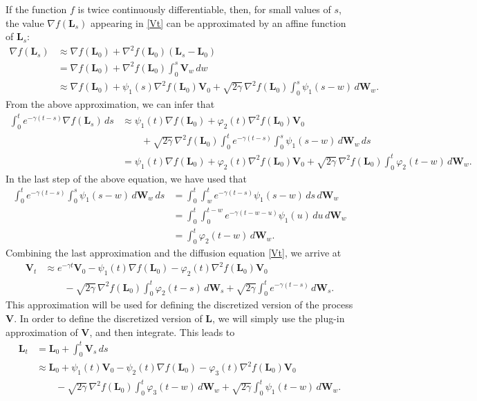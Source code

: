 \documentclass[a4paper,bej,preprint,reqno]{imsart}
\newcommand\bL{\boldsymbol L}
\newcommand\bW{\boldsymbol W}
\newcommand\bV{\boldsymbol V}
\begin{document}
If the function $f$ is twice continuously differentiable, then, for small
values of $s$, the value $\nabla f(\bL_s)$ appearing in \eqref{Vt} can be approximated by an affine function of $\bL_s$:
\begin{align}
\nabla f(\bL_s)
	&\approx \nabla f(\bL_0) + \nabla^2 f(\bL_0) (\bL_s-\bL_0)\\
	& = \nabla f(\bL_0) + \nabla^2 f(\bL_0) \int_0^s \bV_w\,dw\\
	& \approx \nabla f(\bL_0) + \psi_1(s)\nabla^2 f(\bL_0) \bV_0 + \sqrt{2\gamma}\,
	\nabla^2f(\bL_0) \int_0^s \psi_1(s-w)\,d\bW_w.\label{approx_grad}
\end{align}
From the above
approximation, we can infer that
\begin{align}\label{approx}
\int_0^t e^{-\gamma (t-s)} \nabla f(\bL_s)\,ds
	&\approx  \psi_1(t)\nabla f(\bL_0) + \varphi_2(t)\nabla^2 f(\bL_0) \bV_0\\
	&\qquad +
	 \sqrt{2\gamma}\, \nabla^2f(\bL_0) \int_0^te^{-\gamma (t-s)}\int_0^s \psi_1(s-w)\,
	d\bW_w\,ds\\
	&= \psi_1(t)\nabla f(\bL_0) + \varphi_2(t)\nabla^2 f(\bL_0) \bV_0+
	\sqrt{2\gamma}\,\nabla^2f(\bL_0) \int_0^t \varphi_2(t-w)\,d\bW_w.
\end{align}
In the last step of the above equation, we have used that
\begin{align}
\int_0^te^{-\gamma (t-s)}\int_0^s \psi_1(s-w)\,d\bW_w\,ds
	& = \int_0^t \int_{w}^t e^{-\gamma (t-s)} \psi_1(s-w)\,ds\,d\bW_w\\
	& = \int_0^t \int_{0}^{t-w} e^{-\gamma (t-w-u)} \psi_1(u)\,du\,d\bW_w\\
	& = \int_0^t \varphi_2(t-w)\,d\bW_w.
\end{align}
Combining the last approximation and the diffusion equation \eqref{Vt},
we arrive at
\begin{align}
   {\bV}_t
				& \approx e^{-\gamma t}{\bV}_0 -  \psi_1(t)\nabla f(\bL_0)
					- \varphi_2(t)\nabla^2 f(\bL_0) \bV_0\\
					&\qquad -\sqrt{2\gamma}\,\nabla^2 f(\bL_0)\int_0^t \varphi_2(t-s)\,d\bW_s+
					\sqrt{2\gamma}\int_0^t e^{-\gamma (t-s)}\,d\bW_s.
\end{align}
This approximation will be used for defining the discretized version of the process $\bV$.
In order to define the discretized version of $\bL$, we will simply use the plug-in approximation of $\bV$, and then integrate.
This leads to
\begin{align}
	\bL_t &= \bL_0 + \int_0^t\bV_s\,ds\\
	&\approx \bL_0 + \psi_1(t)\bV_0 - \psi_2(t)\nabla f(\bL_0)
		- \varphi_3(t)\nabla^2f(\bL_0)\bV_0\\
	&\qquad - \sqrt{2\gamma}\,\nabla^2f(\bL_0)\int_0^t
	\varphi_3(t-w)\,d\bW_w +\sqrt{2\gamma}\int_0^t\psi_1(t-w)\,d\bW_w.
\end{align}
\end{document}
